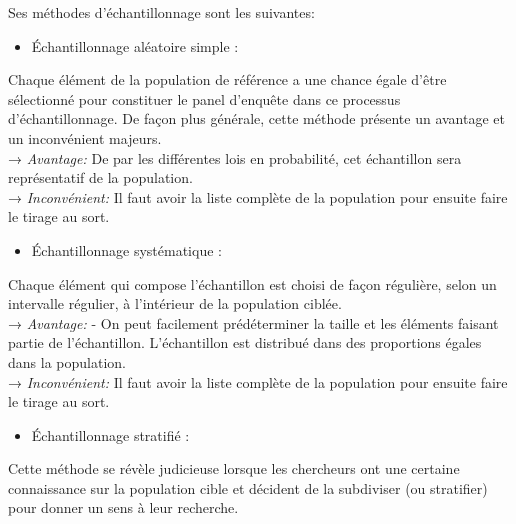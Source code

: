 Ses méthodes d’échantillonnage sont les suivantes: 
	\begin{itemize}
		\item	Échantillonnage aléatoire simple : 
	\end{itemize}
	Chaque élément de la population de référence a une chance égale d’être sélectionné pour constituer le panel d’enquête dans ce processus d’échantillonnage. De façon plus générale, cette méthode présente un avantage et un inconvénient majeurs.\\ 
	→ \textit{Avantage:} De par les différentes lois en probabilité, cet échantillon sera représentatif de la population.\\
	→ \textit{Inconvénient:} Il faut avoir la liste complète de la population pour ensuite faire le tirage au sort.
	\begin{itemize}
		\item	Échantillonnage systématique : 
	\end{itemize}
	Chaque élément qui compose l'échantillon est choisi de façon régulière, selon un intervalle régulier, à l'intérieur de la population ciblée. \\
→ \textit{Avantage:} - On peut facilement prédéterminer la taille et les éléments faisant partie de l'échantillon.
L'échantillon est distribué dans des proportions égales dans la population.\\
→ \textit{Inconvénient:} Il faut avoir la liste complète de la population pour ensuite faire le tirage au sort.
	\begin{itemize}
		\item	Échantillonnage stratifié : 
	\end{itemize}
	Cette méthode se révèle judicieuse lorsque les chercheurs ont une certaine connaissance sur la population cible et décident de la subdiviser (ou stratifier) pour donner un sens à leur recherche.

\noindent

